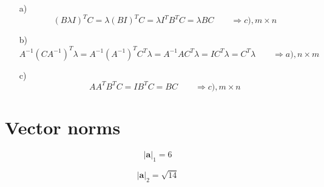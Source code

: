 \documentclass{article}
\begin{document}
\subsection{}
\begin{itemize}
\item[a)]
$$
(B\lambda I)^T C = \lambda (BI)^T C = \lambda I^T B^T C = \lambda B C \qquad \Rightarrow c), m\times n
$$
\item[b)]
$$
A^{-1}(C A^{-1})^T \lambda = A^{-1} (A^{-1})^T C^T \lambda = A^{-1} A C^T \lambda = IC^T\lambda = C^T \lambda \qquad \Rightarrow a), n\times m
$$
\item[c)]
$$
AA^T B^T C = I B^T C = BC \qquad \Rightarrow c),  m\times n
$$
\end{itemize}

\pagebreak

\section{Vector norms}

$$
|\mathbf{a}|_1 = 6
$$

$$
|\mathbf{a}|_2 = \sqrt{14}
$$
\end{document}
